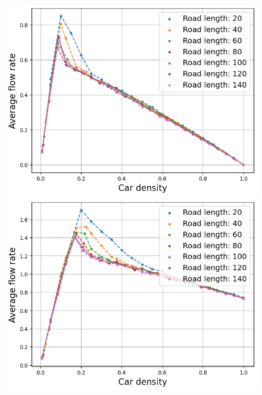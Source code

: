 \documentclass[a4paper,12pt]{article}
\begin{document}
\begin{figure}[H]
    \centering
    \begin{minipage}{.5\textwidth}
        \centering
        \includegraphics[scale=0.47]{Images/fundamental diagrams 1 lane 140.png}
    \end{minipage}%
    \begin{minipage}{.5\textwidth}
        \centering
        \includegraphics[scale=0.47]{Images/fundamental diagrams 2 lanes 140.png}
    \end{minipage}
    \centering
    \begin{minipage}{.5\textwidth}
        \centering

\end{minipage}
\end{figure}
\end{document}
